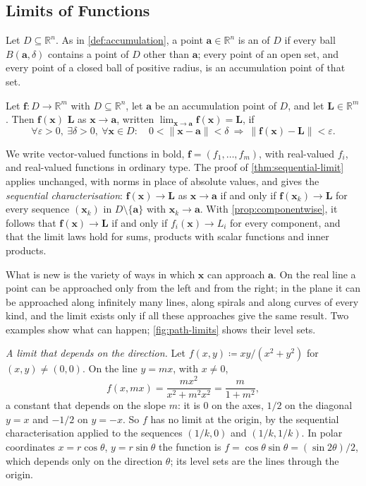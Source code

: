 \subsection{Limits of Functions}

Let $D\subseteq\mathbb R^n$. As in \cref{def:accumulation}, a point $\mathbf a\in\mathbb R^n$ is an  of $D$ if every ball $B(\mathbf a,\delta)$ contains a point of $D$ other than $\mathbf a$; every point of an open set, and every point of a closed ball of positive radius, is an accumulation point of that set.

\begin{definition}
\label{def:limit-rn}
Let $\mathbf f\colon D\to\mathbb R^m$ with $D\subseteq\mathbb R^n$, let $\mathbf a$ be an accumulation point of $D$, and let $\mathbf L\in\mathbb R^m$. Then $\mathbf f(\mathbf x)$  $\mathbf L$ as $\mathbf x\to\mathbf a$, written $\lim_{\mathbf x\to\mathbf a}\mathbf f(\mathbf x)=\mathbf L$, if
\[
\forall\varepsilon>0,\ \exists\delta>0,\ \forall\mathbf x\in D:\quad0<\|\mathbf x-\mathbf a\|<\delta\ \Rightarrow\ \|\mathbf f(\mathbf x)-\mathbf L\|<\varepsilon .
\]
\end{definition}

We write vector-valued functions in bold, $\mathbf f=(f_1,\ldots,f_m)$, with real-valued  $f_i$, and real-valued functions in ordinary type. The proof of \cref{thm:sequential-limit} applies unchanged, with norms in place of absolute values, and gives the \emph{sequential characterisation}: $\mathbf f(\mathbf x)\to\mathbf L$ as $\mathbf x\to\mathbf a$ if and only if $\mathbf f(\mathbf x_k)\to\mathbf L$ for every sequence $(\mathbf x_k)$ in $D\setminus\{\mathbf a\}$ with $\mathbf x_k\to\mathbf a$. With \cref{prop:componentwise}, it follows that $\mathbf f(\mathbf x)\to\mathbf L$ if and only if $f_i(\mathbf x)\to L_i$ for every component, and that the limit laws hold for sums, products with scalar functions and inner products.

What is new is the variety of ways in which $\mathbf x$ can approach $\mathbf a$. On the real line a point can be approached only from the left and from the right; in the plane it can be approached along infinitely many lines, along spirals and along curves of every kind, and the limit exists only if all these approaches give the same result. Two examples show what can happen; \cref{fig:path-limits} shows their level sets.

\emph{A limit that depends on the direction.} Let $f(x,y)\coloneqq xy/(x^2+y^2)$ for $(x,y)\ne(0,0)$. On the line $y=mx$, with $x\ne0$,
\[
f(x,mx)=\frac{mx^2}{x^2+m^2x^2}=\frac m{1+m^2},
\]
a constant that depends on the slope $m$: it is $0$ on the axes, $1/2$ on the diagonal $y=x$ and $-1/2$ on $y=-x$. So $f$ has no limit at the origin, by the sequential characterisation applied to the sequences $(1/k,0)$ and $(1/k,1/k)$. In polar coordinates $x=r\cos\theta$, $y=r\sin\theta$ the function is $f=\cos\theta\sin\theta=(\sin2\theta)/2$, which depends only on the direction $\theta$; its level sets are the lines through the origin.


